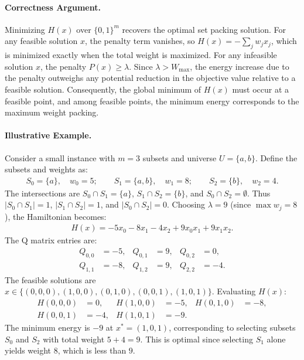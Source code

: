 \documentclass[12pt]{article}
\begin{document}
\paragraph{Correctness Argument.}
Minimizing $H(x)$ over $\{0, 1\}^m$ recovers the optimal set packing solution. For any feasible solution $x$, the penalty term vanishes, so $H(x) = -\sum_{j} w_j x_j$, which is minimized exactly when the total weight is maximized. For any infeasible solution $x$, the penalty $P(x) \ge \lambda$. Since $\lambda > W_{\max}$, the energy increase due to the penalty outweighs any potential reduction in the objective value relative to a feasible solution. Consequently, the global minimum of $H(x)$ must occur at a feasible point, and among feasible points, the minimum energy corresponds to the maximum weight packing.

\paragraph{Illustrative Example.}
Consider a small instance with $m=3$ subsets and universe $U = \{a, b\}$. Define the subsets and weights as:
\begin{align}
    S_0 = \{a\}, \quad w_0 = 5; \qquad
    S_1 = \{a, b\}, \quad w_1 = 8; \qquad
    S_2 = \{b\}, \quad w_2 = 4.
\end{align}
The intersections are $S_0 \cap S_1 = \{a\}$, $S_1 \cap S_2 = \{b\}$, and $S_0 \cap S_2 = \emptyset$. Thus $|S_0 \cap S_1| = 1$, $|S_1 \cap S_2| = 1$, and $|S_0 \cap S_2| = 0$. Choosing $\lambda = 9$ (since $\max w_j = 8$), the Hamiltonian becomes:
\begin{align}
    H(x) = -5 x_0 - 8 x_1 - 4 x_2 + 9 x_0 x_1 + 9 x_1 x_2.
\end{align}
The Q matrix entries are:
\begin{align}
    Q_{0,0} &= -5, & Q_{0,1} &= 9, & Q_{0,2} &= 0, \\
    Q_{1,1} &= -8, & Q_{1,2} &= 9, & Q_{2,2} &= -4.
\end{align}
The feasible solutions are $x \in \{(0,0,0), (1,0,0), (0,1,0), (0,0,1), (1,0,1)\}$. Evaluating $H(x)$:
\begin{align}
    H(0,0,0) &= 0, & H(1,0,0) &= -5, & H(0,1,0) &= -8, \\
    H(0,0,1) &= -4, & H(1,0,1) &= -9.
\end{align}
The minimum energy is $-9$ at $x^* = (1, 0, 1)$, corresponding to selecting subsets $S_0$ and $S_2$ with total weight $5 + 4 = 9$. This is optimal since selecting $S_1$ alone yields weight $8$, which is less than $9$.
\end{document}

